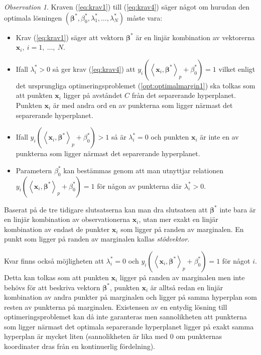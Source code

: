 \documentclass[a4paper, 12pt]{report}
\theoremstyle{definition}
\theoremstyle{remark}
\newtheorem*{rem}{Observation}
\newcommand{\bfbeta}{{\boldsymbol{\beta}}}
\newcommand{\bfx}{\mathbf{x}}
\newcommand{\llangle}{\left\langle}
\newcommand{\rrangle}{\right\rangle}
\newcommand{\inner}[2]{\llangle #1, #2 \rrangle}
\begin{document}
\begin{rem}
	Kraven (\ref{eq:krav1}) till (\ref{eq:krav4}) säger något om hurudan den optimala lösningen $\left(\bfbeta^*, \beta^*_0, \lambda_1^*, \dots, \lambda_N^*\right)$ måste vara:
	\begin{itemize}
		\item Krav (\ref{eq:krav1}) säger att vektorn $\bfbeta^*$ är en linjär kombination av vektorerna $\mathbf{x}_i,~i=1,~\dots,~N$.
		\item Ifall $\lambda^*_i > 0$ så ger krav (\ref{eq:krav4}) att $y_i\left(\inner{\bfx_i}{\bfbeta^*}_p+\beta^*_0\right) = 1$ vilket enligt det ursprungliga optimeringsproblemet (\ref{opt:optimalmargin1}) ska tolkas som att punkten $\mathbf{x}_i$ ligger på avståndet $C$ från det separerande hyperplanet. Punkten $\mathbf{x}_i$ är med andra ord en av punkterna som ligger närmast det separerande hyperplanet.
		\item Ifall $y_i\left(\inner{\bfx_i}{\bfbeta^*}_p + \beta^*_0\right) > 1$ så är $\lambda^*_i = 0$ och punkten $\mathbf{x}_i$ är inte en av punkterna som ligger närmast det separerande hyperplanet.
		\item Parametern $\beta^*_0$ kan bestämmas genom att man utnyttjar relationen $y_i\left(\inner{\bfx_i}{\bfbeta^*}_p + \beta^*_0\right) = 1$ för någon av punkterna där $\lambda^*_i > 0$.
	\end{itemize}
	Baserat på de tre tidigare slutsatserna kan man dra slutsatsen att $\bfbeta^*$ inte bara är en linjär kombination av observationerna $\mathbf{x}_i$, utan mer exakt en linjär kombination av endast de punkter $\mathbf{x}_{i}$ som ligger på randen av marginalen. En punkt som ligger på randen av marginalen kallas \emph{stödvektor}.
\end{rem}

Kvar finns också möjligheten att $\lambda^*_i = 0$ och $y_i\left( \inner{\bfx_i}{\bfbeta^*}_p + \beta^*_0\right) = 1$ för något $i$.
Detta kan tolkas som att punkten $\bfx_i$ ligger på randen av marginalen men inte behövs för att beskriva vektorn $\bfbeta^*$, punkten $\bfx_i$ är alltså redan en linjär kombination av andra punkter på marginalen och ligger på samma hyperplan som resten av punkterna på marginalen.
Existensen av en entydig lösning till optimeringsproblemet kan då inte garanteras men sannolikheten att punkterna som ligger närmast det optimala separerande hyperplanet ligger på exakt samma hyperplan är mycket liten (sannolikheten är lika med 0 om punkternas koordinater dras från en kontinuerlig fördelning).
\newpage
\end{document}
